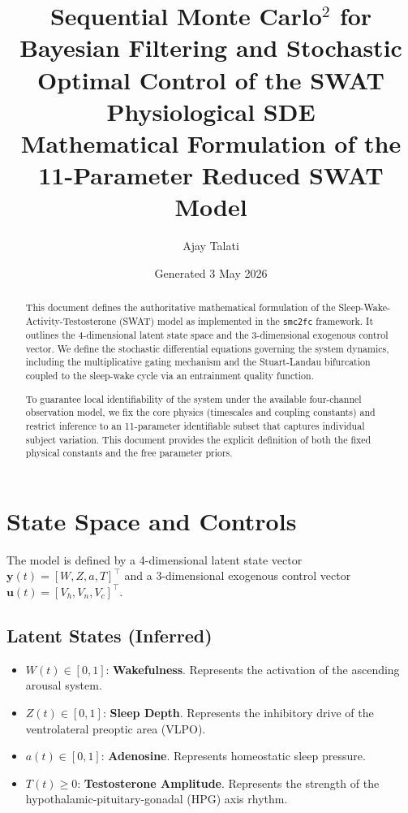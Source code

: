 \documentclass[11pt,a4paper]{article}
\title{Sequential Monte Carlo${}^2$ for Bayesian Filtering and Stochastic Optimal Control of the SWAT Physiological SDE\\[2pt]
\large Mathematical Formulation of the 11-Parameter Reduced SWAT Model}
\author{Ajay Talati}
\date{Generated 3 May 2026}
\begin{document}
\maketitle

\begin{abstract}
\noindent
This document defines the authoritative mathematical formulation of the Sleep-Wake-Activity-Testosterone (SWAT) model as implemented in the \texttt{smc2fc} framework. It outlines the 4-dimensional latent state space and the 3-dimensional exogenous control vector. We define the stochastic differential equations governing the system dynamics, including the multiplicative gating mechanism and the Stuart-Landau bifurcation coupled to the sleep-wake cycle via an entrainment quality function. 

To guarantee local identifiability of the system under the available four-channel observation model, we fix the core physics (timescales and coupling constants) and restrict inference to an 11-parameter identifiable subset that captures individual subject variation. This document provides the explicit definition of both the fixed physical constants and the free parameter priors.
\end{abstract}

\tableofcontents
\medskip

\section{State Space and Controls}

The model is defined by a 4-dimensional latent state vector $\mathbf{y}(t) = [W, Z, a, T]^\top$ and a 3-dimensional exogenous control vector $\mathbf{u}(t) = [V_h, V_n, V_c]^\top$.

\subsection{Latent States (Inferred)}
\begin{itemize}
    \item $W(t) \in [0, 1]$: \textbf{Wakefulness}. Represents the activation of the ascending arousal system.
    \item $Z(t) \in [0, 1]$: \textbf{Sleep Depth}. Represents the inhibitory drive of the ventrolateral preoptic area (VLPO).
    \item $a(t) \in [0, 1]$: \textbf{Adenosine}. Represents homeostatic sleep pressure.
    \item $T(t) \geq 0$: \textbf{Testosterone Amplitude}. Represents the strength of the hypothalamic-pituitary-gonadal (HPG) axis rhythm.
\end{itemize}
\end{document}
